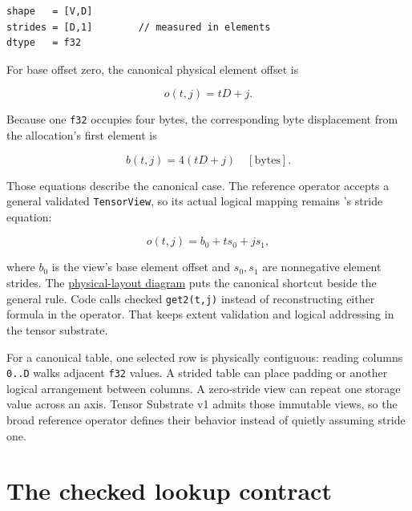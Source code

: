 \begin{verbatim}
shape   = [V,D]
strides = [D,1]        // measured in elements
dtype   = f32
\end{verbatim}

For base offset zero, the canonical physical element offset is

\begin{equation}
o(t,j)=tD+j.
\end{equation}

Because one \texttt{f32} occupies four bytes, the corresponding byte
displacement from the allocation's first element is

\begin{equation}
b(t,j)=4(tD+j)\quad[\mathrm{bytes}].
\end{equation}

Those equations describe the canonical case. The reference operator
accepts a general validated \texttt{TensorView}, so its actual logical
mapping remains 's stride equation:

\begin{equation}
o(t,j)=b_0+t s_0+j s_1,
\end{equation}

where \(b_0\) is the view's base element offset and \(s_0,s_1\) are
nonnegative element strides. The
\href{https://github.com/hermonai/inside-the-llm-engine/blob/astra-visual-rewrite/diagrams/transformer/embedding-physical-layout.txt}{physical-layout
diagram} puts the canonical shortcut beside the general rule. Code calls
checked \texttt{get2(t,j)} instead of reconstructing either formula in
the operator. That keeps extent validation and logical addressing in the
tensor substrate.

For a canonical table, one selected row is physically contiguous:
reading columns \texttt{0..D} walks adjacent \texttt{f32} values. A
strided table can place padding or another logical arrangement between
columns. A zero-stride view can repeat one storage value across an axis.
Tensor Substrate v1 admits those immutable views, so the broad reference
operator defines their behavior instead of quietly assuming stride one.

\section{The checked lookup
contract}\label{the-checked-lookup-contract}


